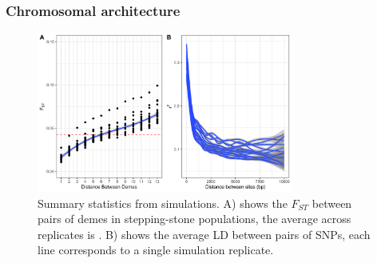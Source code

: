 \documentclass[11pt,twoside,lineno]{GSA_format}
\begin{document}
\subsubsection{Chromosomal architecture}


\begin{figure}
  \includegraphics[width=0.75\textwidth,height=0.75\textheight,keepaspectratio]{../SimulationStudy/directionalSelection/SummaryStats.png}
  \caption{Summary statistics from simulations. A) shows the $F_{ST}$ between pairs of demes in stepping-stone populations, the average across replicates is . B) shows the average LD between pairs of SNPs, each line corresponds to a single simulation replicate.}

  \label{fig:lodgepole}
\end{figure}
\end{document}
